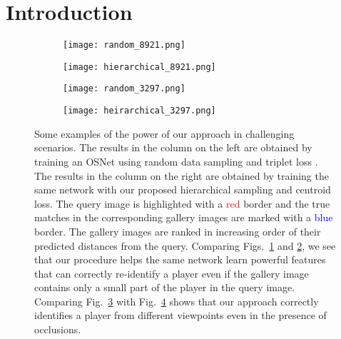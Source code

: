 \documentclass{article}
\begin{document}
\section{Introduction}
\label{sec:introduction}

\begin{figure}[h]
\begin{subfigure}{0.48\textwidth}
         \centering
         \texttt{[image: random\_8921.png]}
         \caption{}
         \label{fig:a}
     \end{subfigure}
     \hfill
    \begin{subfigure}{0.48\textwidth}
        \centering
        \texttt{[image: hierarchical\_8921.png]}
        \caption{}
        \label{fig:b}
    \end{subfigure}
\begin{subfigure}{0.48\textwidth}
         \centering
         \texttt{[image: random\_3297.png]}
         \caption{}
         \label{fig:c}
     \end{subfigure}
     \hfill
     \begin{subfigure}{0.48\textwidth}
         \centering
         \texttt{[image: heirarchical\_3297.png]}
         \caption{}
         \label{fig:d}
     \end{subfigure}
    \caption{Some examples of the power of our approach in challenging scenarios. The results in the column on the left are obtained by training an OSNet \cite{zhou2019omni} using random data sampling and triplet loss \cite{hermans2017defense}. The results in the column on the right are obtained by training the same network with our proposed hierarchical sampling and centroid loss. The query image is highlighted with a \textcolor{red}{red} border and the true matches in the corresponding gallery images are marked with a \textcolor{blue}{blue} border. The gallery images are ranked in increasing order of their predicted distances from the query. Comparing Figs.~\ref{fig:a} and \ref{fig:b}, we see that our procedure helps the same network learn powerful features that can correctly re-identify a player even if the gallery image contains only a small part of the player in the query image. Comparing Fig.~\ref{fig:c} with Fig.~\ref{fig:d} shows that our approach correctly identifies a player from different viewpoints even in the presence of occlusions.}
    \label{fig:results}
\end{figure}
\end{document}

